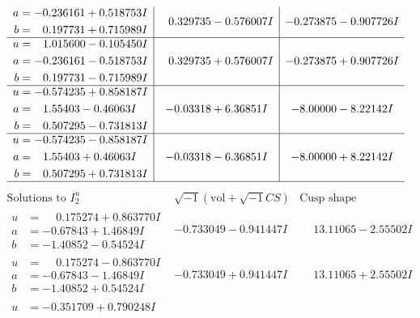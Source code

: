 \documentclass[1p]{elsarticle_modified}
\theoremstyle{definition}
\newcommand{\I}{\sqrt{-1}}
\begin{document}
$$\begin{array}{c|c|c}
\begin{aligned}
a &= -0.236161 + 0.518753 I \\
b &= \phantom{-}0.197731 + 0.715989 I\end{aligned}
 & \phantom{-}0.329735 - 0.576007 I & -0.273875 - 0.907726 I \\ \hline\begin{aligned}
u &= \phantom{-}1.015600 - 0.105450 I \\
a &= -0.236161 - 0.518753 I \\
b &= \phantom{-}0.197731 - 0.715989 I\end{aligned}
 & \phantom{-}0.329735 + 0.576007 I & -0.273875 + 0.907726 I \\ \hline\begin{aligned}
u &= -0.574235 + 0.858187 I \\
a &= \phantom{-}1.55403 - 0.46063 I \\
b &= \phantom{-}0.507295 - 0.731813 I\end{aligned}
 & -0.03318 + 6.36851 I & -8.00000 - 8.22142 I \\ \hline\begin{aligned}
u &= -0.574235 - 0.858187 I \\
a &= \phantom{-}1.55403 + 0.46063 I \\
b &= \phantom{-}0.507295 + 0.731813 I\end{aligned}
 & -0.03318 - 6.36851 I & -8.00000 + 8.22142 I\\
 \hline 
 \end{array}$$\newpage$$\begin{array}{c|c|c}  
\text{Solutions to }I^u_{2}& \I (\text{vol} + \sqrt{-1}CS) & \text{Cusp shape}\\
 \hline 
\begin{aligned}
u &= \phantom{-}0.175274 + 0.863770 I \\
a &= -0.67843 + 1.46849 I \\
b &= -1.40852 - 0.54524 I\end{aligned}
 & -0.733049 - 0.941447 I & \phantom{-}13.11065 - 2.55502 I \\ \hline\begin{aligned}
u &= \phantom{-}0.175274 - 0.863770 I \\
a &= -0.67843 - 1.46849 I \\
b &= -1.40852 + 0.54524 I\end{aligned}
 & -0.733049 + 0.941447 I & \phantom{-}13.11065 + 2.55502 I \\ \hline\begin{aligned}
u &= -0.351709 + 0.790248 I \\

\end{aligned}
\end{array}$$
\end{document}
